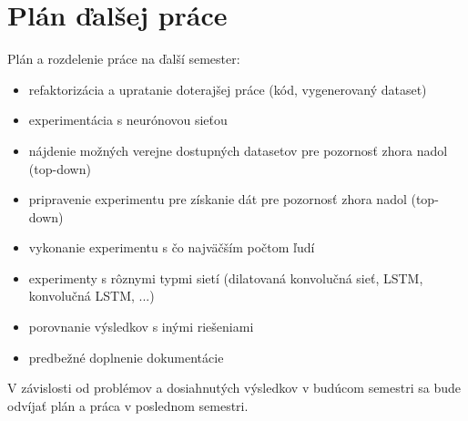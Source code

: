
\newpage
\pagestyle{plain}

\section{Plán ďalšej práce}

Plán a rozdelenie práce na ďalší semester:

\begin{itemize}
	\item refaktorizácia a upratanie doterajšej práce (kód, vygenerovaný dataset)
	\item experimentácia s neurónovou sieťou
	\item nájdenie možných verejne dostupných datasetov pre pozornosť zhora nadol (top-down)
	\item pripravenie experimentu pre získanie dát pre pozornosť zhora nadol (top-down)
	\item vykonanie experimentu s čo najväčším počtom ľudí
	\item experimenty s rôznymi typmi sietí (dilatovaná konvolučná sieť, LSTM, konvolučná LSTM, ...)
	\item porovnanie výsledkov s inými riešeniami
	\item predbežné doplnenie dokumentácie
\end{itemize}

V závislosti od problémov a dosiahnutých výsledkov v budúcom semestri sa bude odvíjať plán a práca v poslednom semestri.